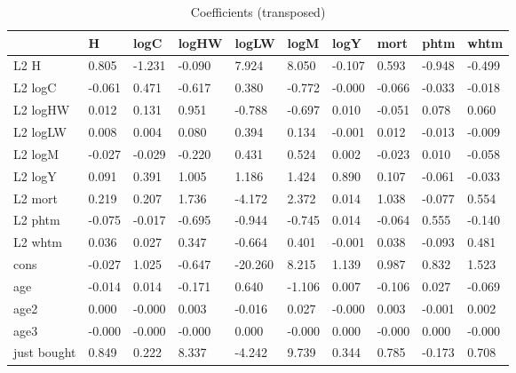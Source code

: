 \begin{table}[htbp]
\caption{\label{clabel} Coefficients (transposed)}\centering\medskip
\begin{tabular}{llllllllll} \hline \hline
 & H  & logC  & logHW  & logLW  & logM  & logY  & mort  & phtm  & whtm  \\  \hline 
L2 H &     0.805 &    -1.231 &    -0.090 &     7.924 &     8.050 &    -0.107 &     0.593 &    -0.948 &    -0.499 \\  
L2 logC &    -0.061 &     0.471 &    -0.617 &     0.380 &    -0.772 &    -0.000 &    -0.066 &    -0.033 &    -0.018 \\  
L2 logHW &     0.012 &     0.131 &     0.951 &    -0.788 &    -0.697 &     0.010 &    -0.051 &     0.078 &     0.060 \\  
L2 logLW &     0.008 &     0.004 &     0.080 &     0.394 &     0.134 &    -0.001 &     0.012 &    -0.013 &    -0.009 \\  
L2 logM &    -0.027 &    -0.029 &    -0.220 &     0.431 &     0.524 &     0.002 &    -0.023 &     0.010 &    -0.058 \\  
L2 logY &     0.091 &     0.391 &     1.005 &     1.186 &     1.424 &     0.890 &     0.107 &    -0.061 &    -0.033 \\  
L2 mort &     0.219 &     0.207 &     1.736 &    -4.172 &     2.372 &     0.014 &     1.038 &    -0.077 &     0.554 \\  
L2 phtm &    -0.075 &    -0.017 &    -0.695 &    -0.944 &    -0.745 &     0.014 &    -0.064 &     0.555 &    -0.140 \\  
L2 whtm &     0.036 &     0.027 &     0.347 &    -0.664 &     0.401 &    -0.001 &     0.038 &    -0.093 &     0.481 \\  
cons &    -0.027 &     1.025 &    -0.647 &   -20.260 &     8.215 &     1.139 &     0.987 &     0.832 &     1.523 \\  
age &    -0.014 &     0.014 &    -0.171 &     0.640 &    -1.106 &     0.007 &    -0.106 &     0.027 &    -0.069 \\  
age2 &     0.000 &    -0.000 &     0.003 &    -0.016 &     0.027 &    -0.000 &     0.003 &    -0.001 &     0.002 \\  
age3 &    -0.000 &    -0.000 &    -0.000 &     0.000 &    -0.000 &     0.000 &    -0.000 &     0.000 &    -0.000 \\  
just bought &     0.849 &     0.222 &     8.337 &    -4.242 &     9.739 &     0.344 &     0.785 &    -0.173 &     0.708 \\  
\hline \hline \end{tabular}
\end{table}
